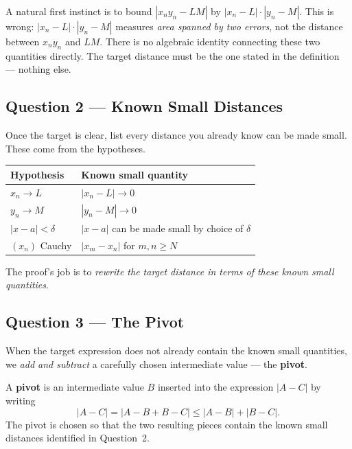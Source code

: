 \begin{remark*}
A natural first instinct is to bound $|x_n y_n - LM|$ by
$|x_n - L| \cdot |y_n - M|$.
This is wrong: $|x_n - L|\cdot|y_n - M|$ measures
\emph{area spanned by two errors}, not the distance between $x_n y_n$
and $LM$.
There is no algebraic identity connecting these two quantities directly.
The target distance must be the one stated in the definition — nothing else.
\end{remark*}

\subsection{Question 2 — Known Small Distances}

Once the target is clear, list every distance you already know can be
made small. These come from the hypotheses.

\medskip
\begin{center}
\renewcommand{\arraystretch}{1.4}
\begin{tabular}{ll}
\toprule
\textbf{Hypothesis} & \textbf{Known small quantity} \\
\midrule
$x_n \to L$ & $|x_n - L| \to 0$ \\
$y_n \to M$ & $|y_n - M| \to 0$ \\
$|x - a| < \delta$ & $|x - a|$ can be made small by choice of $\delta$ \\
$(x_n)$ Cauchy   & $|x_m - x_n|$ for $m,n \ge N$ \\
\bottomrule
\end{tabular}
\end{center}

\medskip

The proof's job is to \emph{rewrite the target distance in terms of
these known small quantities}.

\subsection{Question 3 — The Pivot}

When the target expression does not already contain the known small
quantities, we \emph{add and subtract} a carefully chosen intermediate
value — the \textbf{pivot}.

\begin{tcolorbox}[colback=propbox, colframe=propborder, arc=2pt,
  left=8pt, right=8pt, top=6pt, bottom=6pt,
  title={\small\textbf{Definition (Pivot)}},
  fonttitle=\small\bfseries]
A \textbf{pivot} is an intermediate value $B$ inserted into the
expression $|A - C|$ by writing
\[
  |A - C| = |A - B + B - C| \le |A - B| + |B - C|.
\]
The pivot is chosen so that the two resulting pieces contain the
known small distances identified in Question~2.
\end{tcolorbox}


